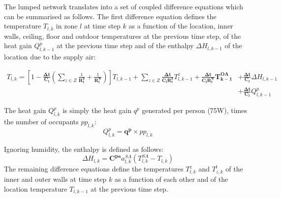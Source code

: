 The lumped network translates into a set of coupled difference equations which can be summarised as follows. The first difference equation defines the temperature $T_{l,k}$ in zone $l$ at time step $k$ as a function of the location, inner walls, ceiling, floor and outdoor temperatures at the previous time step, of the heat gain $Q^p_{l,k-1}$ at the previous time step and of the enthalpy $\Delta H_{l,k-1}$ of the location due to the supply air: 

\begin{equation}\label{eq:roomtemperature}
\begin{split}
{T}_{l,k} = 
\left[ 1 - \frac{\bm{\Delta t}}{\bm{C_l}} (\sum_{z\in Z} \frac{1}{\bm{R^z_l}} + \frac{1}{\bm{R^w_l}})  \right] T_{l,k-1} + 
\sum_{z\in Z} \frac{\bm{\Delta t}}{{\bm{C_l}}{\bm{R^z_l}}} T^{z}_{l,k-1} + 
\frac{\bm{\Delta t}}{{\bm{C_l}}\bm{{R^{w}_l}}} \bm{T^{OA}_{k-1}} 
& + \frac{\bm{\Delta t}}{\bm{C_l}} \Delta H_{l,k-1} \\
& + \frac{\bm{\Delta t}}{\bm{C_l}} Q^{p}_{l,k-1} 
\end{split}
\end{equation}

%

\noindent The heat gain $Q^p_{l,k}$ is simply the heat gain $q^p$ generated per person (75W), times the number of occupants $pp_{l,k}$:
\begin{equation} \label{eq:heatgain}
Q^{p}_{l,k} = \bm{q^{p}} \times pp_{l,k}
\end{equation}

\noindent Ignoring humidity, the enthalpy is defined as follows:
\begin{equation} \label{eq:enthalpy}
\Delta H_{l,k} = \bm{C^{pa}} a^{SA}_{l,k} (T^{SA}_{l,k} - T_{l,k})
\end{equation}
The remaining difference equations define the temperatures $T^z_{l,k}$ and $T^l_{z,k}$ of the inner and outer walls at time step $k$ as a
function of each other and of the location temperature $T_{l,k-1}$ at the previous time step. 

